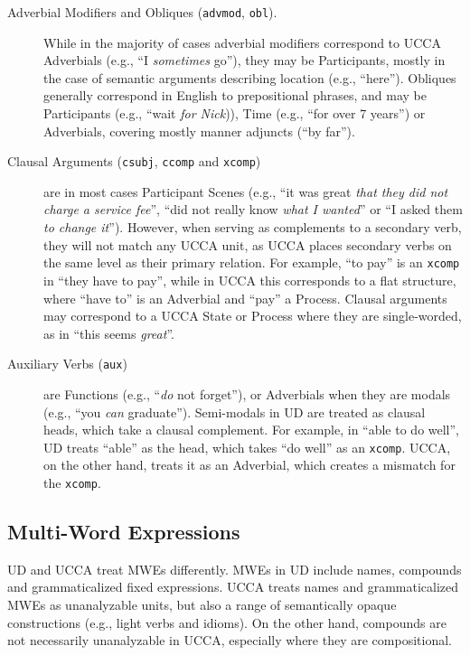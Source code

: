 \documentclass[11pt,a4paper]{article}
\begin{document}
\begin{description}
    \item[Adverbial Modifiers and Obliques (\texttt{advmod}, \texttt{obl}).]
    While in the majority of cases
    adverbial modifiers correspond to UCCA Adverbials (e.g., ``I \textit{sometimes} go''),
    they may be Participants, mostly in the case of semantic arguments describing location (e.g., ``here'').
    Obliques generally correspond in English to prepositional phrases, and may be
    Participants (e.g., ``wait \textit{for Nick})), Time (e.g., ``for over 7 years'') 
    or Adverbials, covering mostly manner adjuncts (``by far'').

    \item[Clausal Arguments (\texttt{csubj}, \texttt{ccomp} and \texttt{xcomp})] 
    are in most cases Participant Scenes
    (e.g., ``it was great \textit{that they did not charge a service fee}'',
    ``did not really know \textit{what I wanted}'' or
    ``I asked them \textit{to change it}'').
    However, when serving as complements to a secondary verb, they
    will not match any UCCA unit, as UCCA places secondary verbs on the 
    same level as their primary relation. 
    For example, ``to pay'' is an \texttt{xcomp} in ``they have to pay'', while in UCCA
    this corresponds to a flat structure, where ``have to'' is an Adverbial and ``pay'' a Process.
    Clausal arguments may correspond to a UCCA State or Process where
    they are single-worded, as in ``this seems \textit{great}''.

    \item[Auxiliary Verbs (\texttt{aux})] are Functions (e.g., ``\textit{do} not forget''),
    or Adverbials when they are modals (e.g., ``you \textit{can} graduate''). Semi-modals 
    in UD are treated as clausal heads, which take a clausal complement. 
    For example, in ``able to do well'', UD treats ``able'' as the head,
    which takes ``do well'' as an \texttt{xcomp}. UCCA, on the other hand,
    treats it as an Adverbial, which creates a mismatch for the \texttt{xcomp}.
    
\end{description}    
    

\subsection{Multi-Word Expressions}\label{sec:mwe}

UD and UCCA treat MWEs differently.
MWEs in UD include names, compounds and grammaticalized fixed expressions.
UCCA treats names and grammaticalized MWEs as unanalyzable units,
but also a range of semantically opaque constructions
(e.g., light verbs and idioms).
On the other hand, compounds are not necessarily unanalyzable in UCCA,
especially where they are compositional.
\end{document}
